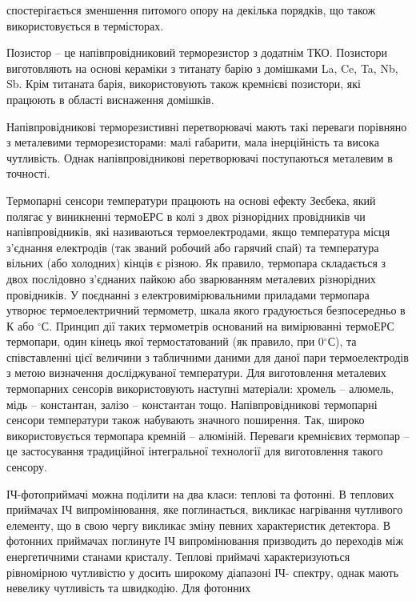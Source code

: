 \documentclass[a4paper,14pt]{extreport}
\begin{document}
  спостерігається зменшення питомого опору на декілька порядків, що також
  використовується в термісторах.\par
  Позистор – це напівпровідниковий терморезистор з додатнім ТКО.
  Позистори виготовляють на основі кераміки з титанату барію з домішками La, Ce,
  Ta, Nb, Sb. Крім титаната барія, використовують також кремнієві позистори, які
  працюють в області виснаження домішків.\par
  Напівпровідникові терморезистивні перетворювачі мають такі переваги
  порівняно з металевими терморезисторами: малі габарити, мала інерційність та
  висока чутливість. Однак напівпровідникові перетворювачі поступаються
  металевим в точності.\par
  Термопарні сенсори температури працюють на основі ефекту Зеєбека, який
  полягає у виникненні термоЕРС в колі з двох різнорідних провідників чи
  напівпровідників, які називаються термоелектродами, якщо температура місця
  з’єднання електродів (так званий робочий або гарячий спай) та температура
  вільних (або холодних) кінців є різною. Як правило, термопара складається з двох
  послідовно з’єднаних пайкою або зварюванням металевих різнорідних
  провідників. У поєднанні з електровимірювальними приладами термопара
  утворює термоелектричний термометр, шкала якого градуюється безпосередньо в
  К або $^\circ$С. Принцип дії таких термометрів оснований на вимірюванні термоЕРС
  термопари, один кінець якої термостатований (як правило, при 0$^\circ$С), та
  співставленні цієї величини з табличними даними для даної пари термоелектродів
  з метою визначення досліджуваної температури. Для виготовлення металевих
  термопарних сенсорів використовують наступні матеріали: хромель – алюмель,
  мідь – константан, залізо – константан тощо. Напівпровідникові термопарні
  сенсори температури також набувають значного поширення. Так, широко
  використовується термопара кремній – алюміній. Переваги кремнієвих термопар –
  це застосування традиційної інтегральної технології для виготовлення такого
  сенсору.\par
  ІЧ-фотоприймачі можна поділити на два класи: теплові та фотонні. В
  теплових приймачах ІЧ випромінювання, яке поглинається, викликає нагрівання
  чутливого елементу, що в свою чергу викликає зміну певних характеристик
  детектора. В фотонних приймачах поглинуте ІЧ випромінювання призводить до
  переходів між енергетичними станами кристалу. Теплові приймачі
  характеризуються рівномірною чутливістю у досить широкому діапазоні ІЧ-
  спектру, однак мають невелику чутливість та швидкодію. Для фотонних
\end{document}

